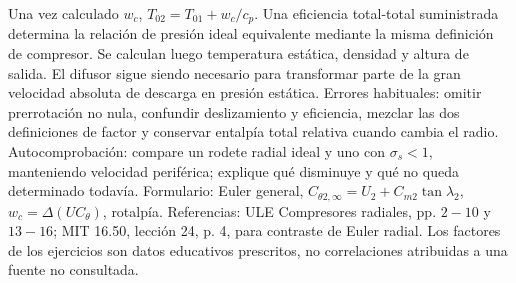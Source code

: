 \documentclass[10pt,openany]{book}
\begin{document}
Una vez calculado \(w_c\), \(T_{02}=T_{01}+w_c/c_p\). Una eficiencia total-total suministrada determina la relación de presión ideal equivalente mediante la misma definición de compresor. Se calculan luego temperatura estática, densidad y altura de salida. El difusor sigue siendo necesario para transformar parte de la gran velocidad absoluta de descarga en presión estática.
Errores habituales: omitir prerrotación no nula, confundir deslizamiento y eficiencia, mezclar las dos definiciones de factor y conservar entalpía total relativa cuando cambia el radio. Autocomprobación: compare un rodete radial ideal y uno con \(\sigma_s<1\), manteniendo velocidad periférica; explique qué disminuye y qué no queda determinado todavía.
Formulario: Euler general, \(C_{\theta2,\infty}=U_2+C_{m2}\tan\lambda_2\), \(w_c=\Delta(UC_\theta)\), rotalpía. Referencias: ULE Compresores radiales, pp. \(2-10\) y \(13-16\); MIT 16.50, lección 24, p. 4, para contraste de Euler radial. Los factores de los ejercicios son datos educativos prescritos, no correlaciones atribuidas a una fuente no consultada.
\end{document}
